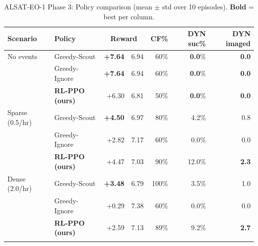 \begin{table}[ht]
\centering
\caption{ALSAT-EO-1 Phase 3: Policy comparison (mean $\pm$ std over 10 episodes). \textbf{Bold} = best per column.}
\label{tab:policy_comparison}
\small
\begin{tabular}{l l r@{\,$\pm$\,}l r r r}
\toprule
Scenario & Policy & \multicolumn{2}{c}{Reward} & CF\% & DYN suc\% & DYN imaged \\
\midrule
No events & Greedy-Scout & \textbf{+7.64} & 6.94 & 60\% & \textbf{0.0}\% & \textbf{0.0} \\
 & Greedy-Ignore & \textbf{+7.64} & 6.94 & 60\% & \textbf{0.0}\% & \textbf{0.0} \\
 & \textbf{RL-PPO (ours)} & +6.30 & 6.81 & 50\% & \textbf{0.0}\% & \textbf{0.0} \\
\addlinespace
Sparse (0.5/hr) & Greedy-Scout & \textbf{+4.50} & 6.97 & 80\% & 4.2\% & 0.8 \\
 & Greedy-Ignore & +2.82 & 7.17 & 60\% & 0.0\% & 0.0 \\
 & \textbf{RL-PPO (ours)} & +4.47 & 7.03 & 90\% & 12.0\% & \textbf{2.3} \\
\addlinespace
Dense (2.0/hr) & Greedy-Scout & \textbf{+3.48} & 6.79 & 100\% & 3.5\% & 1.0 \\
 & Greedy-Ignore & +0.29 & 7.38 & 60\% & 0.0\% & 0.0 \\
 & \textbf{RL-PPO (ours)} & +2.59 & 7.13 & 89\% & 9.2\% & \textbf{2.7} \\
\addlinespace
\bottomrule
\end{tabular}
\end{table}